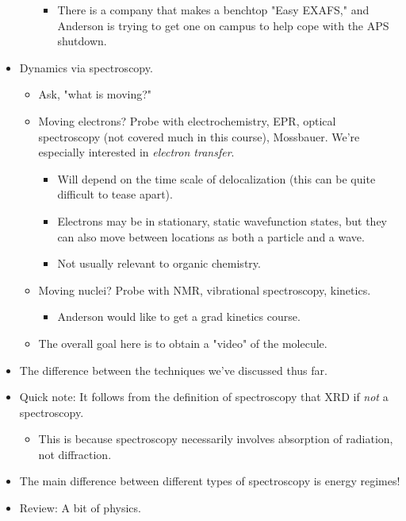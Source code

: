 \documentclass[../notes.tex]{subfiles}
\begin{document}
\begin{itemize}
\begin{itemize}
\begin{itemize}
            \item There is a company that makes a benchtop "Easy EXAFS," and Anderson is trying to get one on campus to help cope with the APS shutdown.
        \end{itemize}
    \end{itemize}
    \item Dynamics via spectroscopy.
    \begin{itemize}
        \item Ask, "what is moving?"
        \item Moving electrons? Probe with electrochemistry, EPR, optical spectroscopy (not covered much in this course), Mossbauer. We're especially interested in \emph{electron transfer}.
        \begin{itemize}
            \item Will depend on the time scale of delocalization (this can be quite difficult to tease apart).
            \item Electrons may be in stationary, static wavefunction states, but they can also move between locations as both a particle and a wave.
            \item Not usually relevant to organic chemistry.
        \end{itemize}
        \item Moving nuclei? Probe with NMR, vibrational spectroscopy, kinetics.
        \begin{itemize}
            \item Anderson would like to get a grad kinetics course.
        \end{itemize}
        \item The overall goal here is to obtain a "video" of the molecule.
    \end{itemize}
    \item The difference between the techniques we've discussed thus far.
    \item Quick note: It follows from the definition of spectroscopy that XRD if \emph{not} a spectroscopy.
    \begin{itemize}
        \item This is because spectroscopy necessarily involves absorption of radiation, not diffraction.
    \end{itemize}
    \item The main difference between different types of spectroscopy is energy regimes!
    \item Review: A bit of physics.
    \begin{itemize}

\end{itemize}
\end{itemize}
\end{document}
